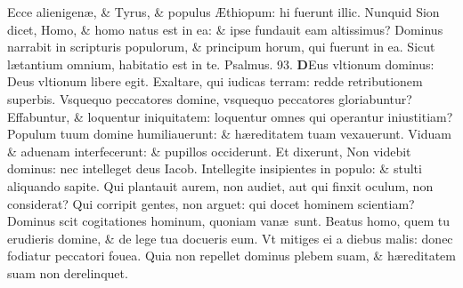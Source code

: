 \documentclass[a5paper,10pt]{book}
\def\ae{æ}
\def\AE{Æ}
\begin{document}
\begin{multicols*}{2}
\newline \color{red} E\color{black}cce alienigen\ae , \& Tyrus, \& populus \AE thiopum: hi fuerunt illic.
\newline \color{red} N\color{black}unquid Sion dicet, Homo, \& homo natus est in ea: \& ipse fundauit eam altissimus?
\newline \color{red} D\color{black}ominus narrabit in scripturis populorum, \& principum horum, qui fuerunt in ea.
\newline \color{red} S\color{black}icut l\ae tantium omnium, habitatio est in te. \quad \color{red} Psalmus. 93. \color{black}
\vspace{-.25em}
\lettrine[lines=2]{\bfseries \color{red} D}{}Eus vltionum dominus: Deus vltionum libere egit.
\newline \color{red} E\color{black}xaltare, qui iudicas terram: redde retributionem superbis.
\newline \color{red} V\color{black}squequo peccatores domine, vsquequo peccatores gloriabuntur?
\newline \color{red} E\color{black}ffabuntur, \& loquentur iniquitatem: loquentur omnes qui operantur iniustitiam?
\newline \color{red} P\color{black}opulum tuum domine humiliauerunt: \& h\ae reditatem tuam vexauerunt.
\newline \color{red} V\color{black}iduam \& aduenam interfecerunt: \& pupillos occiderunt.
\newline \color{red} E\color{black}t dixerunt, Non videbit dominus: nec intelleget deus Iacob.
\newline \color{red} I\color{black}ntellegite insipientes in populo: \& stulti aliquando sapite.
\newline \color{red} Q\color{black}ui plantauit aurem, non audiet, aut qui finxit oculum, non considerat?
\newline \color{red} Q\color{black}ui corripit gentes, non arguet: qui docet hominem scientiam?
\newline \color{red} D\color{black}ominus scit cogitationes hominum, quoniam van\ae \ sunt.
\newline \color{red} B\color{black}eatus homo, quem tu erudieris domine, \& de lege tua docueris eum.
\newline \color{red} V\color{black}t mitiges ei a diebus malis: donec fodiatur peccatori fouea.
\newline \color{red} Q\color{black}uia non repellet dominus plebem suam, \& h\ae reditatem suam non derelinquet.

\end{multicols*}
\end{document}
